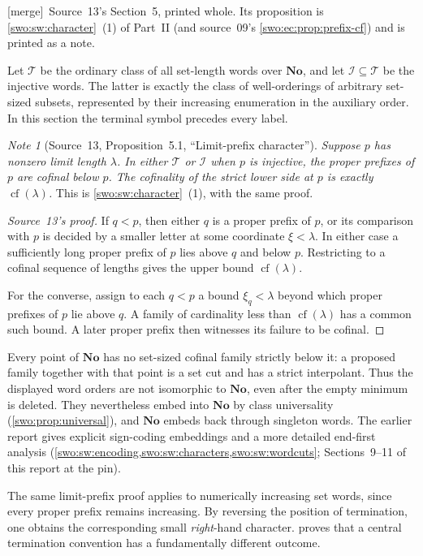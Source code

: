 \documentclass[11pt]{article}
\theoremstyle{definition}
\theoremstyle{remark}
\newtheorem{note}[note]{Note}
\newcommand{\No}{\mathbf{No}}
\newcommand{\I}{\mathcal I}
\newcommand{\WordsAll}{\mathcal T}
\newcommand{\cf}{\operatorname{cf}}
\newcommand{\merge}{\textsf{[merge]}}
\begin{document}
\merge\ Source~13's Section~5, printed whole. Its proposition is
\cref{swo:sw:character}~(1) of Part~II (and source~09's
\cref{swo:ec:prop:prefix-cf}) and is printed as a note.

Let $\WordsAll$ be the ordinary class of all set-length words over $\No$, and
let $\I\subseteq \WordsAll$ be the injective words. The latter is exactly the
class of well-orderings of arbitrary set-sized subsets, represented by
their increasing enumeration in the auxiliary order. In this section the
terminal symbol precedes every label.

\begin{note}[Source~13, Proposition~5.1, ``Limit-prefix character'']\label{swo:fs:prop:wordlimit}
\emph{
Suppose $p$ has nonzero limit length $\lambda$. In either $\WordsAll$ or $\I$
when $p$ is injective, the proper prefixes of $p$ are cofinal below $p$.
The cofinality of the strict lower side at $p$ is exactly $\cf(\lambda)$.}
This is \cref{swo:sw:character}~(1), with the same proof.
\end{note}
\begin{proof}[Source~13's proof]
If $q<p$, then either $q$ is a proper prefix of $p$, or its comparison
with $p$ is decided by a smaller letter at some coordinate
$\xi<\lambda$. In either case a sufficiently long proper prefix of $p$
lies above $q$ and below $p$. Restricting to a cofinal sequence of
lengths gives the upper bound $\cf(\lambda)$.

For the converse, assign to each $q<p$ a bound $\xi_q<\lambda$ beyond
which proper prefixes of $p$ lie above $q$. A family of cardinality less
than $\cf(\lambda)$ has a common such bound. A later proper prefix then
witnesses its failure to be cofinal.
\end{proof}

Every point of $\No$ has no set-sized cofinal family strictly below it:
a proposed family together with that point is a set cut and has a
strict interpolant. Thus the displayed word orders are not isomorphic
to $\No$, even after the empty minimum is deleted. They nevertheless
embed into $\No$ by class universality (\cref{swo:prop:universal}), and $\No$ embeds
back through singleton words. The earlier report gives explicit
sign-coding embeddings and a more detailed end-first analysis
(\cref{swo:sw:encoding,swo:sw:characters,swo:sw:wordcuts}; Sections~9--11 of this report at the pin).

The same limit-prefix proof applies to numerically increasing set
words, since every proper prefix remains increasing. By reversing the
position of termination, one obtains the corresponding small
\emph{right}-hand character.  proves that a
central termination convention has a fundamentally different outcome.
\end{document}
